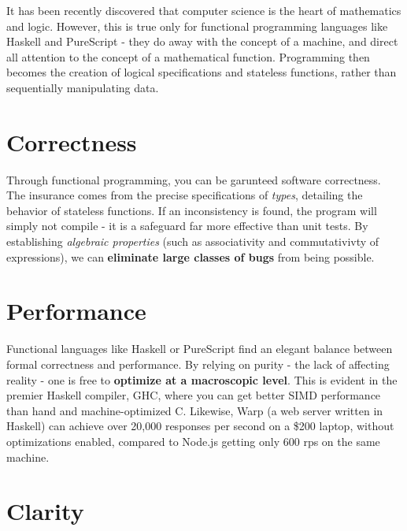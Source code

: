 \documentclass[11pt,pressrelease]{newlfm} %
\begin{document}
\begin{newlfm}


\begin{singlespace} %

It has been recently discovered that computer science is the heart of mathematics and logic.
However, this is true only for functional programming languages like Haskell and PureScript -
they do away with the concept of a machine, and direct all attention to the concept of a
mathematical function. Programming then becomes the creation of logical specifications and
stateless functions, rather than sequentially manipulating data.

\section{Correctness}

Through functional programming, you can be garunteed software correctness. The insurance comes from the
precise specifications of \textit{types}, detailing the behavior of stateless functions. If an
inconsistency is found, the program will simply not compile - it is a safeguard far
more effective than unit tests. By establishing \textit{algebraic properties} (such as associativity and
commutativivty of expressions), we can \textbf{eliminate large classes of bugs}
from being possible.

\section{Performance}

Functional languages like Haskell or PureScript find an elegant balance between formal correctness
and performance. By relying on purity - the lack of affecting reality - one is free to
\textbf{optimize at a macroscopic level}. This is evident in the premier Haskell compiler, GHC,
where you can get better SIMD performance than hand and machine-optimized C.
Likewise, Warp (a web server written in Haskell) can achieve over
20,000 responses per second on a \$200 laptop, without optimizations enabled, compared to
Node.js getting only 600 rps on the same machine.

\section{Clarity}


\end{singlespace}
\end{newlfm}
\end{document}
